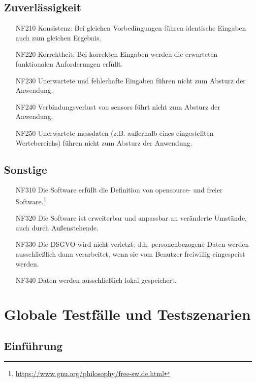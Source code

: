 \documentclass[parskip=full]{scrartcl}
\begin{document}
\subsection{Zuverlässigkeit}

\begin{itemize}

\item[NF210] Konsistenz: Bei gleichen Vorbedingungen führen identische Eingaben auch zum gleichen Ergebnis.
\item[NF220] Korrektheit: Bei korrekten Eingaben werden die erwarteten funktionalen Anforderungen erfüllt.
\item[NF230] Unerwartete und fehlerhafte Eingaben führen nicht zum Absturz der Anwendung.
\item[NF240] Verbindungsverlust von \glspl{sensor} führt nicht zum Absturz der Anwendung.
\item[NF250] Unerwartete \gls{messdaten} (z.B. außerhalb eines eingestellten Wertebereichs) führen nicht zum Absturz der Anwendung.

\end{itemize}

\subsection{Sonstige}

\begin{itemize}

\item[NF310] Die Software erfüllt die Definition von \gls{opensource}- und freier Software.\footnote{\url{https://www.gnu.org/philosophy/free-sw.de.html}}
\item[NF320] Die Software ist erweiterbar und anpassbar an veränderte Umstände, auch durch Außenstehende.
\item[NF330] Die \gls{DSGVO} wird nicht verletzt; d.h. personenbezogene Daten werden ausschließlich dann verarbeitet, wenn sie vom Benutzer freiwillig eingespeist werden.
\item[NF340] Daten werden ausschließlich lokal gespeichert.

\end{itemize}

\section{Globale Testfälle und Testszenarien}\label{testfall}
\subsection{Einführung}
\end{document}
